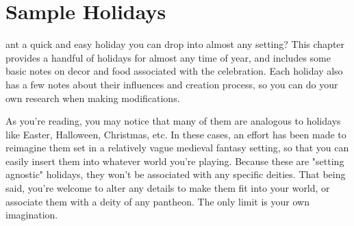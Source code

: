 \documentclass[10pt,a4paper,twoside,bg=print,twocolumn,openany,nodeprecatedcode]{dndbook}
\begin{document}
\chapter{Sample Holidays}
ant a quick and easy holiday you can drop into almost any setting? This chapter provides a handful of holidays for almost any time of year, and includes some basic notes on decor and food associated with the celebration. Each holiday also has a few notes about their influences and creation process, so you can do your own research when making modifications.

As you're reading, you may notice that many of them are analogous to holidays like Easter, Halloween, Christmas, etc. In these cases, an effort has been made to reimagine them set in a relatively vague medieval fantasy setting, so that you can easily insert them into whatever world you're playing. Because these are "setting agnostic" holidays, they won't be associated with any specific deities. That being said, you're welcome to alter any details to make them fit into your world, or associate them with a deity of any pantheon. The only limit is your own imagination.
\end{document}
